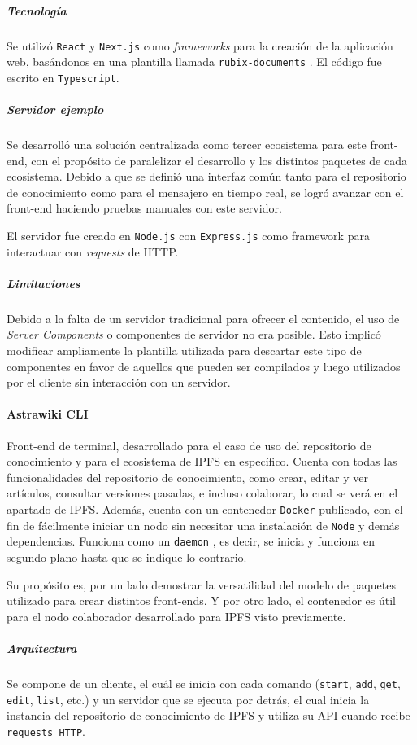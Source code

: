 \subparagraph{Tecnología} Se utilizó \texttt{React} \cite{react} y \texttt{Next.js} \cite{next} como \textit{frameworks} para la creación de la aplicación web, basándonos en una plantilla llamada \texttt{rubix-documents} \cite{rubix}. El código fue escrito en \texttt{Typescript}.

\subparagraph{Servidor ejemplo} Se desarrolló una solución centralizada como tercer ecosistema para este front-end, con el propósito de paralelizar el desarrollo y los distintos paquetes de cada ecosistema. Debido a que se definió una interfaz común tanto para el repositorio de conocimiento como para el mensajero en tiempo real, se logró avanzar con el front-end haciendo pruebas manuales con este servidor.

El servidor fue creado en \texttt{Node.js} con \texttt{Express.js} como framework para interactuar con \textit{requests} de HTTP.

\subparagraph{Limitaciones} Debido a la falta de un servidor tradicional para ofrecer el contenido, el uso de \textit{Server Components} o componentes de servidor \cite{server-components} no era posible. Esto implicó modificar ampliamente la plantilla utilizada para descartar este tipo de componentes en favor de aquellos que pueden ser compilados y luego utilizados por el cliente sin interacción con un servidor.

\paragraph{Astrawiki CLI}

Front-end de terminal, desarrollado para el caso de uso del repositorio de conocimiento y para el ecosistema de IPFS en específico. Cuenta con todas las funcionalidades del repositorio de conocimiento, como crear, editar y ver artículos, consultar versiones pasadas, e incluso colaborar, lo cual se verá en el apartado de IPFS. Además, cuenta con un contenedor \texttt{Docker} publicado, con el fin de fácilmente iniciar un nodo sin necesitar una instalación de \texttt{Node} y demás dependencias. Funciona como un \texttt{daemon} \cite{daemon}, es decir, se inicia y funciona en segundo plano hasta que se indique lo contrario.

Su propósito es, por un lado demostrar la versatilidad del modelo de paquetes utilizado para crear distintos front-ends. Y por otro lado, el contenedor es útil para el nodo colaborador desarrollado para IPFS visto previamente.

\subparagraph{Arquitectura} Se compone de un cliente, el cuál se inicia con cada comando (\texttt{start}, \texttt{add}, \texttt{get}, \texttt{edit}, \texttt{list}, etc.) y un servidor que se ejecuta por detrás, el cual inicia la instancia del repositorio de conocimiento de IPFS y utiliza su API cuando recibe \texttt{requests HTTP}.

